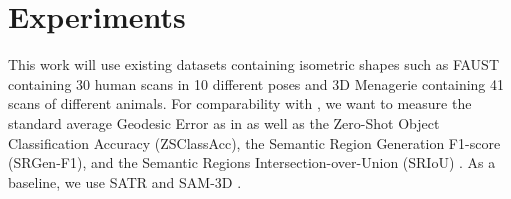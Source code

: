 \section{Experiments}
\label{sec:experiments}

This work will use existing datasets containing isometric shapes such as FAUST \citep{bogo_faust_2014} containing 30 human scans in 10 different poses and 3D Menagerie \citep{zuffi_3d_2017} containing 41 scans of different animals. For comparability with \citet{abdelreheem_zero-shot_2023}, we want to measure the standard average Geodesic Error as in \citet{halimi_unsupervised_2019} as well as the Zero-Shot Object Classification Accuracy (ZSClassAcc), the Semantic Region Generation F1-score (SRGen-F1), and the Semantic Regions Intersection-over-Union (SRIoU) \cite{abdelreheem_zero-shot_2023}. As a baseline, we use SATR \cite{abdelreheem_satr_2023} and SAM-3D \cite{abdelreheem_zero-shot_2023}.